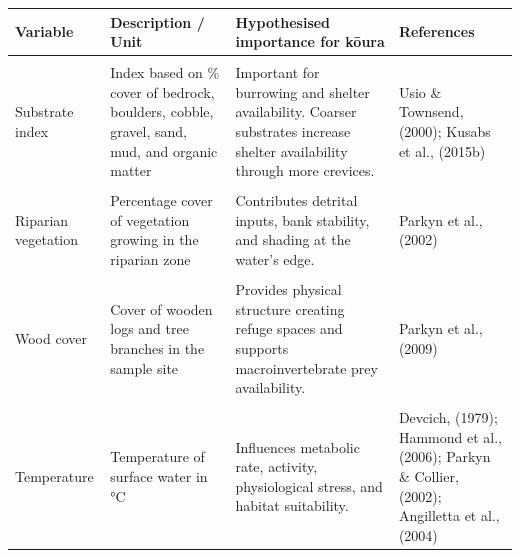 \documentclass[
  12pt,
  a4paper,
  oneside]{scrbook}
\begin{document}
\begin{landscape}
\begin{longtable}[t]{>{\raggedright\arraybackslash}p{2.5cm}>{\raggedright\arraybackslash}p{3.5cm}>{\raggedright\arraybackslash}p{9.5cm}>{\raggedright\arraybackslash}p{5.0cm}}
\toprule
Variable & Description / Unit & Hypothesised importance for kōura & References\\
\midrule
\cellcolor{gray!8}{Lake identity} & \cellcolor{gray!8}{Categorical variable identifying lake} & \cellcolor{gray!8}{Captures unmeasured lake-specific differences in water chemistry, productivity, and catchment characteristics.} & \cellcolor{gray!8}{Zuur et al., (2009)}\\
Substrate index & Index based on \% cover of bedrock, boulders, cobble, gravel, sand, mud, and organic matter & Important for burrowing and shelter availability. Coarser substrates increase shelter availability through more crevices. & Usio \& Townsend, (2000); Kusabs et al., (2015b)\\
\cellcolor{gray!8}{Slope} & \cellcolor{gray!8}{Slope from shoreline to the 5 m depth contour} & \cellcolor{gray!8}{Steeper slopes facilitate access to deeper water during daylight refuging and associate with coarser substrates.} & \cellcolor{gray!8}{Devcich, (1979); Kusabs et al., (2015b)}\\
Riparian vegetation & Percentage cover of vegetation growing in the riparian zone & Contributes detrital inputs, bank stability, and shading at the water's edge. & Parkyn et al., (2002)\\
\cellcolor{gray!8}{Overhanging trees} & \cellcolor{gray!8}{Percentage cover of trees hanging over the shoreline} & \cellcolor{gray!8}{Provides direct shading and structural inputs into littoral habitats.} & \cellcolor{gray!8}{Smith et al., (1996); Vedia et al., (2017)}\\
\addlinespace
Wood cover & Cover of wooden logs and tree branches in the sample site & Provides physical structure creating refuge spaces and supports macroinvertebrate prey availability. & Parkyn et al., (2009)\\
\cellcolor{gray!8}{Emergent and submerged macrophytes} & \cellcolor{gray!8}{Percentage cover of macrophytes in the sample site divided over emergent and submerged and native and non-native species} & \cellcolor{gray!8}{Native macrophytes can provide cover and serve as a food source. Non-native macrophytes may alter movement pathways and modify local habitat and water quality conditions.} & \cellcolor{gray!8}{Coffey \& Clayton, (1988); Kusabs \& Quinn, (2009)}\\
Temperature & Temperature of surface water in °C & Influences metabolic rate, activity, physiological stress, and habitat suitability. & Devcich, (1979); Hammond et al., (2006); Parkyn \& Collier, (2002); Angilletta et al., (2004)\\

\end{longtable}
\end{landscape}
\end{document}
